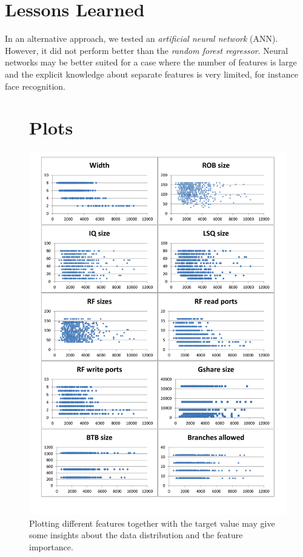 \documentclass[a4paper, 11pt]{article}
\begin{document}
\section{Lessons Learned} In an alternative approach, we tested an \textit{artificial neural network} (ANN). However, it did not perform better than the \textit{random forest regressor}. Neural networks may be better suited for a case where the number of features is large and the explicit knowledge about separate features is very limited, for instance face recognition.

\begin{figure}
\section{Plots}\label{plots}
 \centering 
	\includegraphics[height=\textheight]{graph.png}
	\caption{Plotting different features together with the target 			value may give some insights about the data distribution and the 			feature importance.}
\end{figure}
\end{document}

